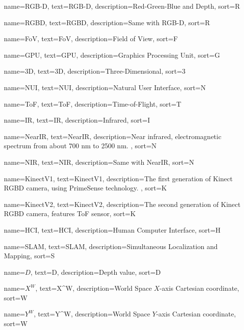 %
{%
  name={RGB-D},
  text={RGB-D},
  description={Red-Green-Blue and Depth},
  sort={R}
}

%
{%
  name={RGBD},
  text={RGBD},
  description={Same with \gls{RGB-D}},
  sort={R}
}

%
{%
  name={FoV},
  text={FoV},
  description={Field of View},
  sort={F}
}

%
{%
  name={GPU},
  text={GPU},
  description={Graphics Processing Unit},
  sort={G}
}

%
{%
  name={3D},
  text={3D},
  description={Three-Dimensional},
  sort={3}
}

%
{%
  name={NUI},
  text={NUI},
  description={Natural User Interface},
  sort={N}
}

%
{%
  name={ToF},
  text={ToF},
  description={Time-of-Flight},
  sort={T}
}

%
{%
  name={IR},
  text={IR},
  description={Infrared},
  sort={I}
}

%
{%
  name={NearIR},
  text={NearIR},
  description={Near infrared, electromagnetic spectrum from about 700 nm to 2500 nm. },
  sort={N}
}

%
{%
  name={NIR},
  text={NIR},
  description={Same with \gls{NearIR}},
  sort={N}
}

%
{%
  name={KinectV1},
  text={KinectV1},
  description={The first generation of Kinect  \gls{RGBD} camera, using PrimeSense technology. },
  sort={K}
}

%
{%
  name={KinectV2},
  text={KinectV2},
  description={The second generation of Kinect \gls{RGBD} camera, features \gls{ToF} sensor},
  sort={K}
}

%
{%
  name={HCI},
  text={HCI},
  description={Human Computer Interface},
  sort={H}
}

%
{%
  name={SLAM},
  text={SLAM},
  description={Simultaneous Localization and Mapping},
  sort={S}
}

%
{%
  name={$D$},
  text={D},
  description={Depth value},
  sort={D}
}

%
{%
  name={$X^W$},
  text={X^W},
  description={World Space $X$-axis Cartesian coordinate},
  sort={W}
}

%
{%
  name={$Y^W$},
  text={Y^W},
  description={World Space $Y$-axis Cartesian coordinate},
  sort={W}
}

